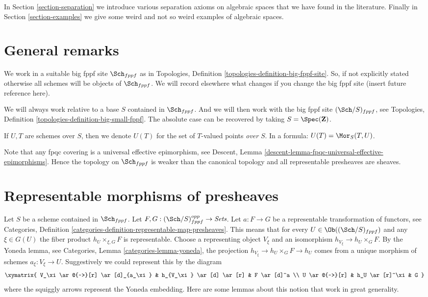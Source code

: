 \medskip\noindent
In Section \ref{section-separation} we introduce various separation
axioms on algebraic spaces that we have found in the literature.
Finally in Section \ref{section-examples}
we give some weird and not so weird examples of algebraic spaces.






\section{General remarks}
\label{section-general}

\noindent
We work in a suitable big fppf site $\Sch_{fppf}$
as in Topologies, Definition \ref{topologies-definition-big-fppf-site}.
So, if not explicitly stated otherwise all schemes will be objects
of $\Sch_{fppf}$.
We will record elsewhere what changes if you change the big
fppf site (insert future reference here).

\medskip\noindent
We will always work relative to a base $S$ contained in $\Sch_{fppf}$.
And we will then work with the big fppf site $(\Sch/S)_{fppf}$,
see Topologies, Definition \ref{topologies-definition-big-small-fppf}.
The absolute case can be recovered by taking
$S = \Spec(\mathbf{Z})$.

\medskip\noindent
If $U, T$ are schemes over $S$, then we denote
$U(T)$ for the set of $T$-valued points {\it over} $S$.
In a formula: $U(T) = \Mor_S(T, U)$.

\medskip\noindent
Note that any fpqc covering is a universal effective epimorphism, see
Descent, Lemma \ref{descent-lemma-fpqc-universal-effective-epimorphisms}.
Hence the topology on $\Sch_{fppf}$
is weaker than the canonical topology and all representable presheaves
are sheaves.







\section{Representable morphisms of presheaves}
\label{section-representable}

\noindent
Let $S$ be a scheme contained in $\Sch_{fppf}$.
Let $F, G : (\Sch/S)_{fppf}^{opp} \to \textit{Sets}$.
Let $a : F \to G$ be a representable transformation of functors, see
Categories,
Definition \ref{categories-definition-representable-map-presheaves}.
This means that for every
$U \in \Ob((\Sch/S)_{fppf})$ and
any $\xi \in G(U)$ the fiber product $h_U \times_{\xi, G} F$ is representable.
Choose a representing object $V_\xi$ and an isomorphism
$h_{V_\xi} \to h_U \times_G F$.
By the Yoneda lemma, see Categories, Lemma \ref{categories-lemma-yoneda},
the projection $h_{V_\xi} \to h_U \times_G F \to h_U$ comes from a unique
morphism of schemes $a_\xi : V_\xi \to U$.
Suggestively we could represent this by the diagram
$$
\xymatrix{
V_\xi \ar@{~>}[r] \ar[d]_{a_\xi} & h_{V_\xi} \ar[d] \ar[r] & F \ar[d]^a \\
U \ar@{~>}[r] & h_U \ar[r]^\xi & G
}
$$
where the squiggly arrows represent the Yoneda embedding.
Here are some lemmas about this notion that work in great generality.

